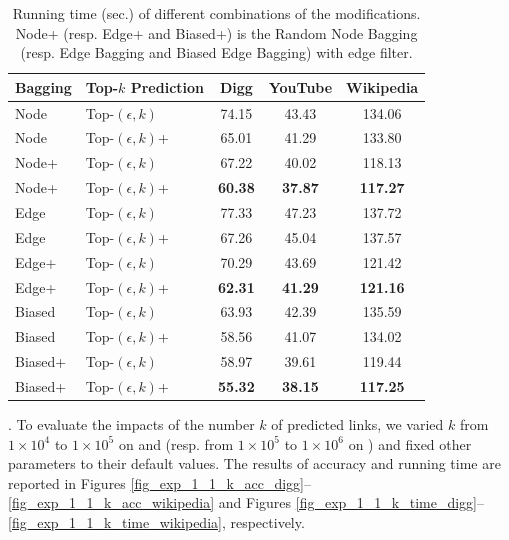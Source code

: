 \begin{table}
\caption{Running time (sec.) of different combinations of the modifications. Node+
(resp. Edge+ and Biased+) is the Random Node Bagging (resp. Edge Bagging
and Biased Edge Bagging) with edge filter.}
\label{tab_improvements}
\vspace{-2ex}
\centering
\newcommand{\tabincell}[2]{\begin{tabular}{@{}#1@{}}#2\end{tabular}}
\begin{tabular}{l|l|c|c|c}
\hline \hline Bagging & Top-$k$ Prediction & Digg & YouTube & Wikipedia  \\
\hline \hline
Node & Top-$(\epsilon, k)$           & 74.15    & 43.43 & 134.06  \\
Node & Top-$(\epsilon, k)$+        & 65.01    & 41.29 & 133.80 \\
Node+ & Top-$(\epsilon, k)$        & 67.22    & 40.02 & 118.13  \\
Node+ & Top-$(\epsilon, k)$+    & \textbf{60.38}   & \textbf{37.87} & \textbf{117.27} \\
\hline
Edge & Top-$(\epsilon, k)$            & 77.33   & 47.23 & 137.72  \\
Edge & Top-$(\epsilon, k)$+        & 67.26    & 45.04 & 137.57  \\
Edge+ & Top-$(\epsilon, k)$        & 70.29   & 43.69 & 121.42 \\
Edge+ & Top-$(\epsilon, k)$+    & \textbf{62.31}    & \textbf{41.29} & \textbf{121.16} \\
\hline
Biased & Top-$(\epsilon, k)$         & 63.93    & 42.39 & 135.59  \\
Biased & Top-$(\epsilon, k)$+      & 58.56    & 41.07 & 134.02  \\
Biased+ & Top-$(\epsilon, k)$      & 58.97    & 39.61 & 119.44  \\
Biased+ & Top-$(\epsilon, k)$+  & \textbf{55.32}    & \textbf{38.15} & \textbf{117.25}  \\
\hline \hline
\end{tabular}
\vspace{-2ex}
\end{table}





. To evaluate the impacts of the number $k$ of
predicted links, we varied $k$ from $1\times 10^4$ to $1\times 10^5$ on \Digg
and \YouTube (resp. from $1\times 10^5$ to $1\times 10^6$ on \Wikipedia)
and fixed other parameters to their default values.
The results of accuracy and running time are reported in Figures \ref{fig_exp_1_1_k_acc_digg}--\ref{fig_exp_1_1_k_acc_wikipedia}
and Figures \ref{fig_exp_1_1_k_time_digg}--\ref{fig_exp_1_1_k_time_wikipedia}, respectively.





